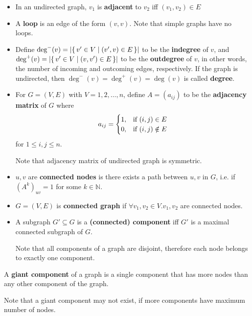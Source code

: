 \begin{definition}
    \begin{itemize}[leftmargin=*]
        \item In an undirected graph, $v_1$ is \textbf{adjacent} to $v_2$ iff $(v_1, v_2) \in E$
        \item A \textbf{loop} is an edge of the form $(v, v)$.
        Note that simple graphs have no loops.
        \item Define $\deg^-(v) = \left| \{\, v' \in V \mid (v', v) \in E \, \} \right|$ to be the \textbf{indegree} of $v$, and $\deg^+(v) = \left| \{\, v' \in V \mid (v, v') \in E \, \} \right|$ to be the \textbf{outdegree} of $v$, in other words, the number of incoming and outcoming edges, respectively.
        If the graph is undirected, then $\deg^-(v) = \deg^+(v) = \deg(v)$ is called \textbf{degree}.
        \item For $G = (V, E)$ with $V = {1, 2, \dots, n}$, define $A = (a_{ij})$ to be the \textbf{adjacency matrix} of $G$ where
        \[ a_{ij} = \begin{cases}
                        1, & \textnormal{if}\ (i, j) \in E \\
                        0, & \textnormal{if}\ (i, j) \notin E
        \end{cases} \]
        for $1 \leq i, j \leq n$.

        Note that adjacency matrix of undirected graph is symmetric.
    \end{itemize}
\end{definition}

\begin{definition}[Connectedness]
    \begin{itemize}[leftmargin=*]
        \item $u, v$ are \textbf{connected nodes} is there exists a path between $u, v$ in $G$, i.e. if $(A^k)_{uv} = 1$ for some $k\in \mathbb{N}$.
        \item $G = (V, E)$ is \textbf{connected graph} if $\forall v_1, v_2 \in V. v_1, v_2$ are connected nodes.
        \item A subgraph $G' \subseteq G$ is a \textbf{(connected) component} iff $G'$ is a maximal connected subgraph of $G$.

        Note that all components of a graph are disjoint, therefore each node belongs to exactly one component.
    \end{itemize}

        \item A \textbf{giant component} of a graph is a single component that has more nodes than any other component of the graph.

        Note that a giant component may not exist, if more components have maximum number of nodes.
\end{definition}

